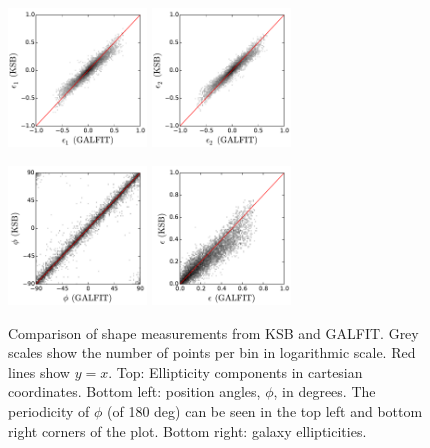 \begin{figure}
\begin{minipage}[b]{2.9in}
\centerline{\includegraphics[width=1.45in]{chapter4/e1.pdf}
            \includegraphics[width=1.45in]{chapter4/e2.pdf}}
\centerline{\includegraphics[width=1.45in]{chapter4/phi.pdf}
            \includegraphics[width=1.45in]{chapter4/ellipticities.pdf}}
\end{minipage}
\begin{minipage}[b]{1.9in}
 \caption{\small Comparison of shape measurements from KSB and GALFIT. Grey scales show the number 
of points per bin in logarithmic scale. Red lines show $y=x$. Top: Ellipticity components in 
cartesian coordinates. Bottom left: position angles, $\phi$, in degrees. The periodicity of $\phi$ 
(of 180 deg) can be seen in the top left and bottom right corners of the plot. Bottom right: 
galaxy ellipticities.}
\label{f:methods}
\end{minipage}
\end{figure}

